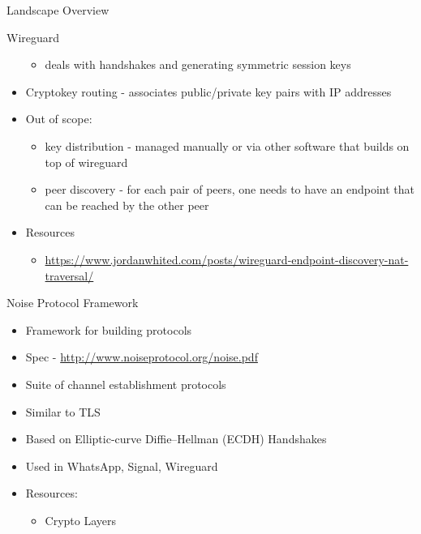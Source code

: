 \begin{frame}[fragile]{Landscape Overview}
\begin{block}{Wireguard}
\begin{itemize}
  \begin{itemize}
  \tightlist
  \item
    deals with handshakes and generating symmetric session keys
  \end{itemize}
\item
  Cryptokey routing - associates public/private key pairs with IP
  addresses
\item
  Out of scope:

  \begin{itemize}
  \tightlist
  \item
    key distribution - managed manually or via other software that
    builds on top of wireguard
  \item
    peer discovery - for each pair of peers, one needs to have an
    endpoint that can be reached by the other peer
  \end{itemize}
\item
  Resources

  \begin{itemize}
  \tightlist
  \item
    \url{https://www.jordanwhited.com/posts/wireguard-endpoint-discovery-nat-traversal/}
  \end{itemize}
\end{itemize}
\end{block}

\begin{block}{Noise Protocol Framework}
\protect\hypertarget{noise-protocol-framework}{}
\begin{itemize}
\tightlist
\item
  Framework for building protocols
\item
  Spec - \url{http://www.noiseprotocol.org/noise.pdf}
\item
  Suite of channel establishment protocols
\item
  Similar to TLS
\item
  Based on Elliptic-curve Diffie--Hellman (ECDH) Handshakes
\item
  Used in WhatsApp, Signal, Wireguard
\item
  Resources:

  \begin{itemize}
  \tightlist
  \item
    Crypto Layers


\end{itemize}
\end{itemize}
\end{block}
\end{frame}
